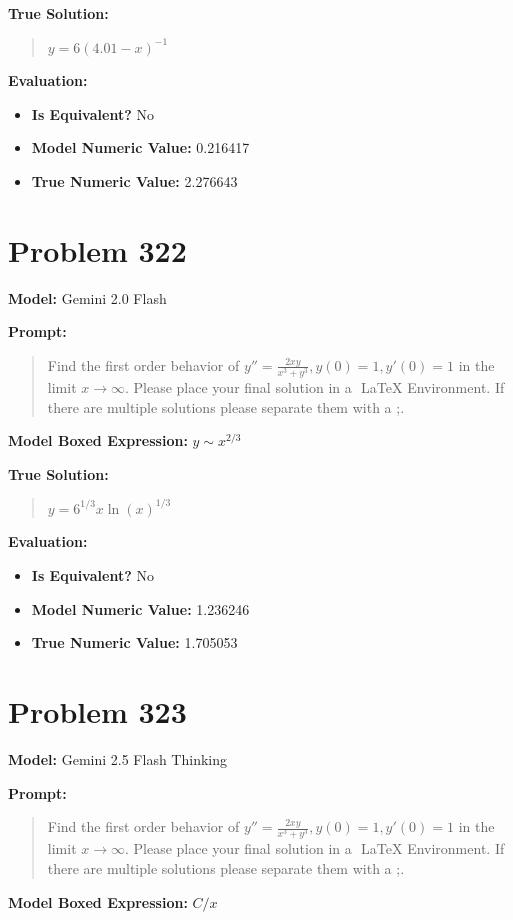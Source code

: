 \documentclass{article}
\begin{document}
{\textbf{True Solution:}
\begin{quote}
$y=6(4.01-x)^{-1}$
\end{quote}

\textbf{Evaluation:}
\begin{itemize}
\item \textbf{Is Equivalent?} No
\item \textbf{Model Numeric Value:} 0.216417
\item \textbf{True Numeric Value:} 2.276643
\end{itemize}
\vspace{1cm}
\section*{Problem 322}
\textbf{Model:} Gemini 2.0 Flash

\textbf{Prompt:}
\begin{quote}
Find the first order behavior of $y'' = \frac{2xy}{x^3 + y^3}, y(0)=1,y'(0)=1$ in the limit $x \rightarrow \infty$. Please place your final solution in a $\boxed{}$ LaTeX Environment. If there are multiple solutions please separate them with a ;.
\end{quote}
\textbf{Model Boxed Expression:} $y \sim x^{2/3}$

\textbf{True Solution:}
\begin{quote}
$y = 6^{1/3} x \ln(x)^{1/3}$
\end{quote}

\textbf{Evaluation:}
\begin{itemize}
\item \textbf{Is Equivalent?} No
\item \textbf{Model Numeric Value:} 1.236246
\item \textbf{True Numeric Value:} 1.705053
\end{itemize}
\vspace{1cm}
\section*{Problem 323}
\textbf{Model:} Gemini 2.5 Flash Thinking

\textbf{Prompt:}
\begin{quote}
Find the first order behavior of $y'' = \frac{2xy}{x^3 + y^3}, y(0)=1,y'(0)=1$ in the limit $x \rightarrow \infty$. Please place your final solution in a $\boxed{}$ LaTeX Environment. If there are multiple solutions please separate them with a ;.
\end{quote}
\textbf{Model Boxed Expression:} $C/x$

}
\end{document}
